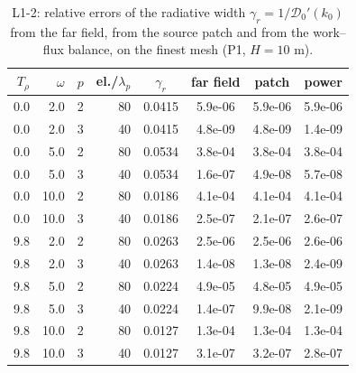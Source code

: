 \begin{table}[htbp]
\centering
\caption{L1-2: relative errors of the radiative width $\gamma_r = 1/\mathcal{D}_0'(k_0)$ from the far field, from the source patch and from the work--flux balance, on the finest mesh (P1, $H = 10$ m).}
\label{tab:L1-2}
\begin{tabular}{rrrrcccc}
\toprule
$T_\rho$ & $\omega$ & $p$ & el./$\lambda_p$ & $\gamma_r$ & far field & patch & power \\
\midrule
0.0 & 2.0 & 2 & 80 & 0.0415 & 5.9e-06 & 5.9e-06 & 5.9e-06 \\
0.0 & 2.0 & 3 & 40 & 0.0415 & 4.8e-09 & 4.8e-09 & 1.4e-09 \\
0.0 & 5.0 & 2 & 80 & 0.0534 & 3.8e-04 & 3.8e-04 & 3.8e-04 \\
0.0 & 5.0 & 3 & 40 & 0.0534 & 1.6e-07 & 4.9e-08 & 5.7e-08 \\
0.0 & 10.0 & 2 & 80 & 0.0186 & 4.1e-04 & 4.1e-04 & 4.1e-04 \\
0.0 & 10.0 & 3 & 40 & 0.0186 & 2.5e-07 & 2.1e-07 & 2.6e-07 \\
9.8 & 2.0 & 2 & 80 & 0.0263 & 2.5e-06 & 2.5e-06 & 2.6e-06 \\
9.8 & 2.0 & 3 & 40 & 0.0263 & 1.4e-08 & 1.3e-08 & 2.4e-09 \\
9.8 & 5.0 & 2 & 80 & 0.0224 & 4.9e-05 & 4.8e-05 & 4.9e-05 \\
9.8 & 5.0 & 3 & 40 & 0.0224 & 1.4e-07 & 9.9e-08 & 2.1e-09 \\
9.8 & 10.0 & 2 & 80 & 0.0127 & 1.3e-04 & 1.3e-04 & 1.3e-04 \\
9.8 & 10.0 & 3 & 40 & 0.0127 & 3.1e-07 & 3.2e-07 & 2.8e-07 \\
\bottomrule
\end{tabular}
\end{table}
